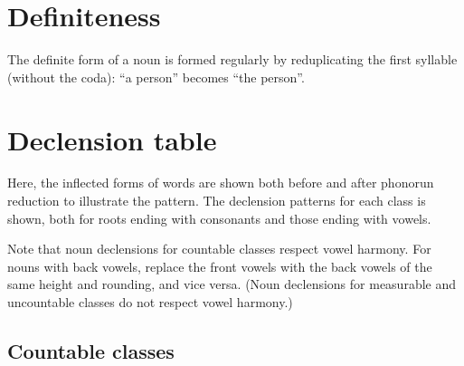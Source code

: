 \documentclass{book}
\begin{document}
\section{Definiteness}

The definite form of a noun is formed regularly by reduplicating the first syllable (without the coda):  ``a person'' becomes  ``the person''.

\section{Declension table}

Here, the inflected forms of words are shown both before and after phonorun reduction to illustrate the pattern. The declension patterns for each class is shown, both for roots ending with consonants and those ending with vowels.

Note that noun declensions for countable classes respect vowel harmony. For nouns with back vowels, replace the front vowels with the back vowels of the same height and rounding, and vice versa. (Noun declensions for measurable and uncountable classes do not respect vowel harmony.)

\subsection{Countable classes}
\end{document}
